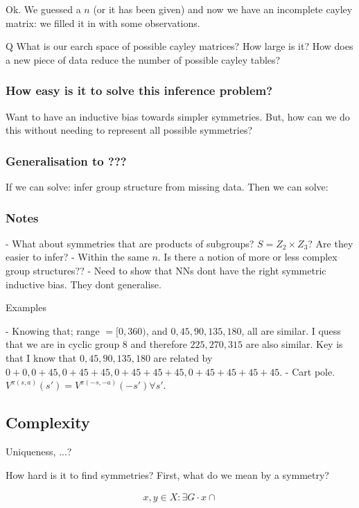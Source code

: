 Ok. We guessed a $n$ (or it has been given) and now we have an incomplete cayley matrix: we filled it in with some observations.

Q What is our earch space of possible cayley matrices? How large is it?
How does a new piece of data reduce the number of possible cayley tables?

\subsubsection{How easy is it to solve this inference problem?}

Want to have an inductive bias towards simpler symmetries. But, how can we do this without needing to represent all possible symmetries?


\subsubsection{Generalisation to ???}

If we can solve: infer group structure from missing data.
Then we can solve:

\subsubsection{Notes}

- What about symmetries that are products of subgroups? $S = Z_2 \times Z_3$?
Are they easier to infer?
- Within the same $n$. Is there a notion of more or less complex group structures??
- Need to show that NNs dont have the right symmetric inductive bias. They dont generalise.

Examples

- Knowing that; range $= [0,360)$, and $0, 45, 90, 135, 180$, all are similar. I quess that we are in cyclic group $8$ and therefore $225, 270, 315$ are also similar. Key is that I know that $0, 45, 90, 135, 180$ are related by $0+0, 0+45, 0+45+45, 0+45+45+45, 0+45+45+45+45$.
- Cart pole. $V^{\pi(s, a)}(s') = V^{\pi(-s, -a)}(-s') \forall s'$.



\subsection{Complexity}

Uniqueness, ...?

How hard is it to find symmetries?
First, what do we mean by a symmetry?

\begin{align}
x, y \in X : \exists G \cdot x \cap
\end{align}



